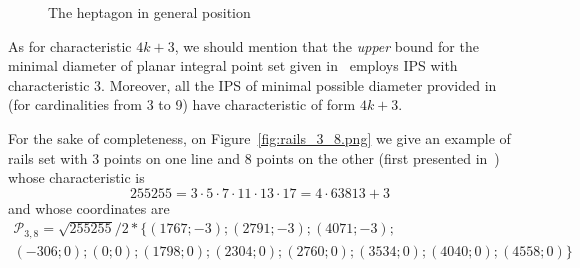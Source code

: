 \documentclass[a4paper,14pt]{article} %
\theoremstyle{plain}
\theoremstyle{definition}
\begin{document}
\begin{figure}
\caption{The heptagon in general position}
\label{fig:heptagon2}
\end{figure}

As for characteristic $4k+3$, we should mention that the \emph{upper} bound for the minimal diameter
of planar integral point set given in~\cite{harborth1993upper} employs IPS with characteristic $3$.
Moreover, all the IPS of minimal possible diameter provided in~\cite[\S 5, Figure 1]{harborth1993upper}
(for cardinalities from 3 to 9) have characteristic of form $4k+3$.

For the sake of completeness, on Figure~\ref{fig:rails_3_8.png}
we give an example of rails set
with 3 points on one line and 8 points on the other (first presented in~\cite[Figure 1]{avdeev2019particular})
whose characteristic is
\begin{equation}
	255255 = 3 \cdot 5 \cdot 7 \cdot 11 \cdot 13 \cdot 17
	 = 4 \cdot 63813  + 3
\end{equation}
and whose coordinates are
\begin{multline}
\mathcal{P}_{3,8}=\sqrt{255255}/2*\{
	( 1767 ; -3);
	( 2791 ; -3);
	( 4071 ; -3);
\\
	( -306 ; 0);
	( 0 ; 0);
	( 1798 ; 0);
	( 2304 ; 0);
	( 2760 ; 0);
	( 3534 ; 0);
	( 4040 ; 0);
	( 4558 ; 0)
\}
\end{multline}
\end{document}
